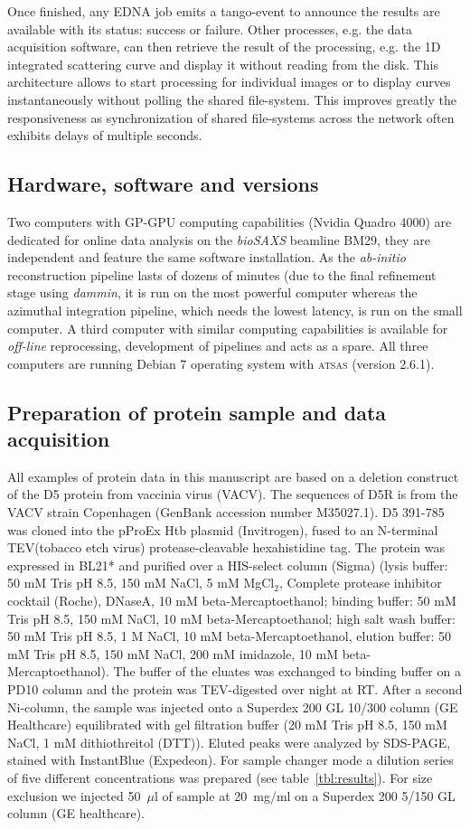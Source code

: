 \documentclass[preprint,pdf]{iucr}              %
\begin{document}
Once finished, any EDNA job emits a tango-event to announce the results are
available with its status: success or failure.
Other processes, e.g. the data acquisition software, can then retrieve the result
of the processing, e.g. the 1D integrated scattering curve and
display it without reading from the disk.
This architecture allows to start processing for individual images or to
display curves instantaneously without polling the shared file-system.
This improves greatly the responsiveness as synchronization of shared
file-systems across the network often exhibits delays of multiple seconds.

\subsection{Hardware, software and versions}
Two computers with GP-GPU computing capabilities (Nvidia Quadro 4000) are
dedicated for online data analysis on the \textit{bioSAXS} beamline BM29, they are
independent and feature the same software installation.
As the \textit{ab-initio} reconstruction pipeline lasts of dozens of minutes
(due to the final refinement stage using \textit{dammin}, it is run on the most
powerful computer whereas the azimuthal integration pipeline, which needs the lowest
latency, is run on the small computer.
A third computer with similar computing capabilities is available for
\textit{off-line} reprocessing, development of pipelines and acts as a spare.
All three computers are running Debian 7 operating system with \textsc{atsas}
(version 2.6.1).


\subsection{Preparation of protein sample and data acquisition}
All examples of protein data in this manuscript are based on a deletion construct of
the D5 protein from vaccinia virus (VACV).
The sequences of D5R is from the VACV strain Copenhagen (GenBank accession number M35027.1).
D5 391-785 was cloned into the pProEx Htb plasmid (Invitrogen), fused to an N-terminal
TEV(tobacco etch virus) protease-cleavable hexahistidine tag. The protein was expressed in
BL21* and purified over a HIS-select column (Sigma) (lysis buffer: 50 mM Tris pH 8.5, 150 mM NaCl,
5 mM MgCl$_{2}$, Complete protease inhibitor cocktail (Roche), DNaseA, 10 mM beta-Mercaptoethanol; 
binding buffer: 50 mM Tris pH 8.5, 150 mM NaCl, 10 mM beta-Mercaptoethanol; 
high salt wash buffer: 50 mM Tris pH 8.5, 1 M NaCl, 10 mM beta-Mercaptoethanol, 
elution buffer: 50 mM Tris pH 8.5, 150 mM NaCl,  200 mM imidazole, 10 mM beta-Mercaptoethanol). 
The buffer of the eluates was exchanged to binding buffer on a PD10 column and the protein was 
TEV-digested over night at RT. After a second Ni-column, the sample was injected onto a 
Superdex 200 GL 10/300 column (GE Healthcare) equilibrated with gel filtration buffer 
(20 mM Tris pH 8.5, 150 mM NaCl, 1 mM dithiothreitol (DTT)). Eluted peaks were analyzed by 
SDS-PAGE, stained with InstantBlue (Expedeon).
For sample changer mode a dilution series of five different concentrations was prepared
(see table~\ref{tbl:results}). For size exclusion we injected 50~$\mu$l of sample at 20~mg/ml on a Superdex
200 5/150 GL column (GE healthcare).
\end{document}
